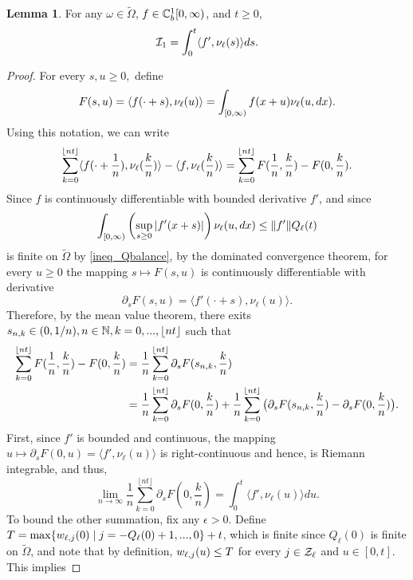 \documentclass{article}
\theoremstyle{definition}
\newtheorem{lemma}[theorem]{Lemma}
\numberwithin{equation}{section}
\begin{document}
\begin{lemma}\label{lem_I1}
For any $\omega\in\tilde{\Omega}$, $f\in\mathbb{C}_b^{1}[0,\infty)$, and $t\geq0$,
\begin{equation}\label{I1}
  \mathcal{I}_1 = \int_{0}^{t}\langle f',\nu_\ell(s)\rangle ds.
\end{equation}
\end{lemma}
\begin{proof}
For every $s,u\geq0,$ define 
\[
	F(s,u)=\langle f(\cdot+s),\nu_\ell(u)\rangle =\int_{[0,\infty)}f(x+u)\nu_\ell(u,dx).
\]
Using this notation, we can write 
\begin{equation}\label{temp_I1a}
     \sum_{k=0}^{\lfloor nt\rfloor} \langle f(\cdot+\frac{1}{n}),\nu_\ell(\frac{k}{n})\rangle-\langle f,\nu_\ell(\frac{k}{n})\rangle=\sum_{k=0}^{\lfloor nt\rfloor} F(\frac{1}{n},\frac{k}{n})-F(0,\frac{k}{n}).
\end{equation}
Since $f$ is continuously differentiable with bounded derivative $f'$, and since 
\[
\int_{[0,\infty)} \left(\sup_{s\geq0}|f'(x+s)|\right)\nu_\ell(u,dx) \leq \|f'\| Q_\ell(t)
\]
is finite on $\tilde\Omega$ by \eqref{ineq_Qbalance}, by the dominated convergence theorem, for every $u\geq0$ the mapping $s\mapsto F(s,u)$ is continuously differentiable with derivative
\[
\partial_s F(s,u) = \langle f'(\cdot+s),\nu_\ell(u) \rangle.
\]
Therefore, by the mean value theorem, there exits $s_{n,k}\in(0,1/n),n\in\mathbb{N}, k=0,...,\lfloor nt\rfloor$ such that 
\begin{align}
\sum_{k=0}^{\lfloor nt\rfloor} F(\frac{1}{n},\frac{k}{n})-F(0,\frac{k}{n})&  = \frac{1}{n}\sum_{k=0}^{\lfloor nt\rfloor} \partial_sF(s_{n,k},\frac{k}{n}) \notag\\ & = \frac{1}{n}\sum_{k=0}^{\lfloor nt\rfloor} \partial_sF(0,\frac{k}{n})+ \frac{1}{n}\sum_{k=0}^{\lfloor nt\rfloor} \big(\partial_sF(s_{n,k},\frac{k}{n})-\partial_sF(0,\frac{k}{n})\big).
\end{align}
First, since $f'$ is bounded and continuous, the mapping $u\mapsto\partial_sF(0,u) = \langle f',\nu_\ell(u) \rangle $ is right-continuous and hence, is Riemann integrable, and  thus,
\begin{equation}
\lim_{n\to\infty}\frac{1}{n}\sum_{k=0}^{\lfloor nt\rfloor} \partial_sF(0,\frac{k}{n}) = \int_0^t \langle f',\nu_\ell(u) \rangle du.
\end{equation}
To bound the other summation, fix any $\epsilon>0$. Define $T=\max\{w_{\ell,j}(0)\;|\; j=-Q_\ell(0)+1,...,0\}+t$, which is finite since $Q_\ell(0)$ is finite on $\tilde\Omega$, and note that by definition, $w_{\ell,j}(u)\leq T$ for every $j\in\mathcal{Z}_\ell$ and $u\in[0,t]$. This implies 

\end{proof}
\end{document}
